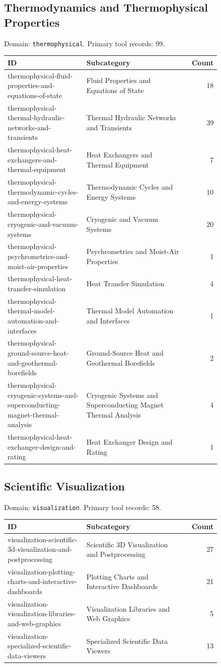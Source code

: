 \subsection{Thermodynamics and Thermophysical Properties}
\noindent Domain: \texttt{thermophysical}. Primary tool records: 99.
\begin{longtable}{p{0.37\linewidth}p{0.47\linewidth}r}
ID & Subcategory & Count\\\hline\endhead
thermophysical-fluid-properties-and-equations-of-state & Fluid Properties and Equations of State & 18\\
thermophysical-thermal-hydraulic-networks-and-transients & Thermal Hydraulic Networks and Transients & 39\\
thermophysical-heat-exchangers-and-thermal-equipment & Heat Exchangers and Thermal Equipment & 7\\
thermophysical-thermodynamic-cycles-and-energy-systems & Thermodynamic Cycles and Energy Systems & 10\\
thermophysical-cryogenic-and-vacuum-systems & Cryogenic and Vacuum Systems & 20\\
thermophysical-psychrometrics-and-moist-air-properties & Psychrometrics and Moist-Air Properties & 1\\
thermophysical-heat-transfer-simulation & Heat Transfer Simulation & 4\\
thermophysical-thermal-model-automation-and-interfaces & Thermal Model Automation and Interfaces & 1\\
thermophysical-ground-source-heat-and-geothermal-borefields & Ground-Source Heat and Geothermal Borefields & 2\\
thermophysical-cryogenic-systems-and-superconducting-magnet-thermal-analysis & Cryogenic Systems and Superconducting Magnet Thermal Analysis & 4\\
thermophysical-heat-exchanger-design-and-rating & Heat Exchanger Design and Rating & 1\\
\end{longtable}
\subsection{Scientific Visualization}
\noindent Domain: \texttt{visualization}. Primary tool records: 58.
\begin{longtable}{p{0.37\linewidth}p{0.47\linewidth}r}
ID & Subcategory & Count\\\hline\endhead
visualization-scientific-3d-visualization-and-postprocessing & Scientific 3D Visualization and Postprocessing & 27\\
visualization-plotting-charts-and-interactive-dashboards & Plotting Charts and Interactive Dashboards & 21\\
visualization-visualization-libraries-and-web-graphics & Visualization Libraries and Web Graphics & 5\\
visualization-specialized-scientific-data-viewers & Specialized Scientific Data Viewers & 13\\
\end{longtable}
